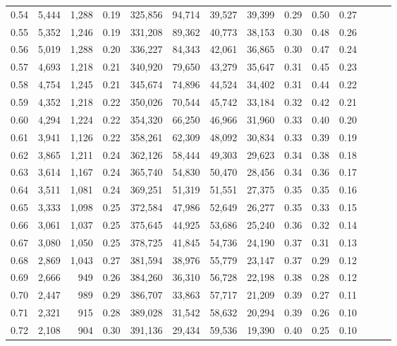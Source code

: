 \begin{tabular}{rrrrrrrrrrrrrr}
0.54 &  5,444 &  1,288 &  0.19 &  325,856 &   94,714 &  39,527 &  39,399 &  0.29 &  0.50 &      0.27 \\
0.55 &  5,352 &  1,246 &  0.19 &  331,208 &   89,362 &  40,773 &  38,153 &  0.30 &  0.48 &      0.26 \\
0.56 &  5,019 &  1,288 &  0.20 &  336,227 &   84,343 &  42,061 &  36,865 &  0.30 &  0.47 &      0.24 \\
0.57 &  4,693 &  1,218 &  0.21 &  340,920 &   79,650 &  43,279 &  35,647 &  0.31 &  0.45 &      0.23 \\
0.58 &  4,754 &  1,245 &  0.21 &  345,674 &   74,896 &  44,524 &  34,402 &  0.31 &  0.44 &      0.22 \\
0.59 &  4,352 &  1,218 &  0.22 &  350,026 &   70,544 &  45,742 &  33,184 &  0.32 &  0.42 &      0.21 \\
0.60 &  4,294 &  1,224 &  0.22 &  354,320 &   66,250 &  46,966 &  31,960 &  0.33 &  0.40 &      0.20 \\
0.61 &  3,941 &  1,126 &  0.22 &  358,261 &   62,309 &  48,092 &  30,834 &  0.33 &  0.39 &      0.19 \\
0.62 &  3,865 &  1,211 &  0.24 &  362,126 &   58,444 &  49,303 &  29,623 &  0.34 &  0.38 &      0.18 \\
0.63 &  3,614 &  1,167 &  0.24 &  365,740 &   54,830 &  50,470 &  28,456 &  0.34 &  0.36 &      0.17 \\
0.64 &  3,511 &  1,081 &  0.24 &  369,251 &   51,319 &  51,551 &  27,375 &  0.35 &  0.35 &      0.16 \\
0.65 &  3,333 &  1,098 &  0.25 &  372,584 &   47,986 &  52,649 &  26,277 &  0.35 &  0.33 &      0.15 \\
0.66 &  3,061 &  1,037 &  0.25 &  375,645 &   44,925 &  53,686 &  25,240 &  0.36 &  0.32 &      0.14 \\
0.67 &  3,080 &  1,050 &  0.25 &  378,725 &   41,845 &  54,736 &  24,190 &  0.37 &  0.31 &      0.13 \\
0.68 &  2,869 &  1,043 &  0.27 &  381,594 &   38,976 &  55,779 &  23,147 &  0.37 &  0.29 &      0.12 \\
0.69 &  2,666 &    949 &  0.26 &  384,260 &   36,310 &  56,728 &  22,198 &  0.38 &  0.28 &      0.12 \\
0.70 &  2,447 &    989 &  0.29 &  386,707 &   33,863 &  57,717 &  21,209 &  0.39 &  0.27 &      0.11 \\
0.71 &  2,321 &    915 &  0.28 &  389,028 &   31,542 &  58,632 &  20,294 &  0.39 &  0.26 &      0.10 \\
0.72 &  2,108 &    904 &  0.30 &  391,136 &   29,434 &  59,536 &  19,390 &  0.40 &  0.25 &      0.10 \\

\end{tabular}
